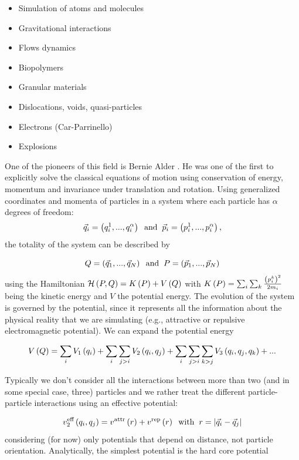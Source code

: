 \begin{itemize}
\item Simulation of atoms and molecules
\item Gravitational interactions
\item Flows dynamics
\item Biopolymers
\item Granular materials
\item Dislocations, voids, quasi-particles
\item Electrons (Car-Parrinello)
\item Explosions
\end{itemize}

\vspace{0.5cm}
\noindent
One of the pioneers of this field is Bernie Alder \citep{alder_first}. He was one of the first to explicitly solve the classical equations of motion using conservation of energy, momentum and invariance under translation and rotation. Using generalized coordinates and momenta of particles in a system where each particle has $\alpha$ degrees of freedom:
$$
\vec{q}_i = \left(q^1_i,...,q^\alpha_i\right) 
\hspace{0.2cm} \text{and} \hspace{0.2cm}
\vec{p}_i = \left(p^1_i,...,p^\alpha_i\right),
$$
the totality of the system can be described by

$$
Q = \left(\vec{q}_1,...,\vec{q}_N\right) 
\hspace{0.2cm} \text{and} \hspace{0.2cm}
P= \left(\vec{p}_1,...,\vec{p}_N\right) 
$$
using the Hamiltonian $\mathcal{H}\left(P,Q\right) = K\left(P\right) + V\left(Q\right)$ with $K\left(P\right)= \sum_i{  \sum_{k}{  \frac{\left(p^k_i\right)^2}{2 m_i}  }  }$ being the kinetic energy and $V$ the potential energy. The evolution of the system is governed by the potential, since it represents all the information about the physical reality that we are simulating (e.g., attractive or repulsive electromagnetic potential). We can expand the potential energy 

$$
V\left(Q\right)  = 
\sum_i{V_1\left(q_i\right)} +
\sum_i{   \sum_{j> i} { V_2\left(q_i,q_j\right)   }} +
\sum_i{   \sum_{j> i} {    \sum_{k > j} {     V_3\left(q_i,q_j,q_k\right)     }  }}   + ...
$$


Typically we don't consider all the interactions between more than two (and in some special case, three) particles and we rather treat the different particle-particle interactions using an effective potential:

$$
v^{\text{eff}}_2\left(q_i,q_j\right) =  v^{\text{attr}}\left(r\right) + v^{\text{rep}}\left(r\right)
\hspace{0.2cm} \text{with} \hspace{0.2cm}
r=\left|\vec{q}_i - \vec{q}_j\right|
$$
considering (for now) only potentials that depend on distance, not particle orientation. Analytically, the simplest potential is the hard core potential

